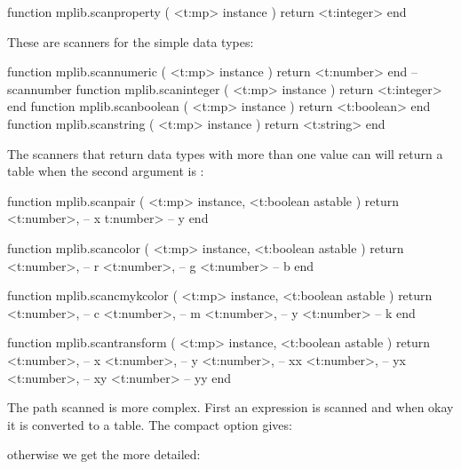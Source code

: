 \starttyping[option=LUA]
function mplib.scanproperty ( <t:mp> instance )
    return <t:integer>
end
\stoptyping

These are scanners for the simple data types:

\starttyping[option=LUA]
function mplib.scannumeric ( <t:mp> instance ) return <t:number>  end -- scannumber
function mplib.scaninteger ( <t:mp> instance ) return <t:integer> end
function mplib.scanboolean ( <t:mp> instance ) return <t:boolean> end
function mplib.scanstring  ( <t:mp> instance ) return <t:string>  end
\stoptyping

The scanners that return data types with more than one value can will return a
table when the second argument is :

\starttyping[option=LUA]
function mplib.scanpair ( <t:mp> instance, <t:boolean astable )
    return
        <t:number>, -- x
        t:number>   -- y
end
\stoptyping

\starttyping[option=LUA]
function mplib.scancolor (
    <t:mp>      instance,
    <t:boolean astable
)
    return
        <t:number>, -- r
        <t:number>, -- g
        <t:number>  -- b
end
\stoptyping

\starttyping[option=LUA]
function mplib.scancmykcolor ( <t:mp> instance, <t:boolean astable )
    return
        <t:number>, -- c
        <t:number>, -- m
        <t:number>, -- y
        <t:number>  -- k
end
\stoptyping

\starttyping[option=LUA]
function mplib.scantransform ( <t:mp> instance, <t:boolean astable )
    return
        <t:number>, -- x
        <t:number>, -- y
        <t:number>, -- xx
        <t:number>, -- yx
        <t:number>, -- xy
        <t:number>  -- yy
end
\stoptyping

The path scanned is more complex. First an expression is scanned and when okay
it is converted to a table. The compact option gives:

\stoptyping

otherwise we get the more detailed:

\stoptyping

